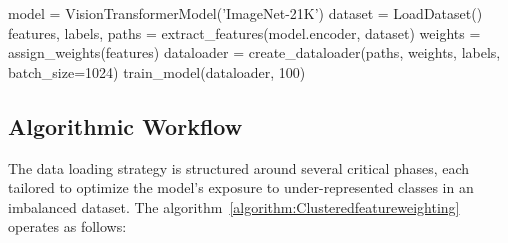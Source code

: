 \begin{algorithm}
\begin{algorithmic}[1]
\State model = VisionTransformerModel('ImageNet-21K')
\State dataset = LoadDataset()  %
\State features, labels, paths = extract\_features(model.encoder, dataset)
\State weights = assign\_weights(features)
\State dataloader = create\_dataloader(paths, weights, labels, batch\_size=1024)
\State train\_model(dataloader, 100)  %
\end{algorithmic}
\end{algorithm}

\subsection{Algorithmic Workflow}
The data loading strategy is structured around several critical phases, each tailored to optimize the model's exposure to under-represented classes in an imbalanced dataset. The algorithm~\ref{algorithm:Clusteredfeatureweighting} operates as follows:

